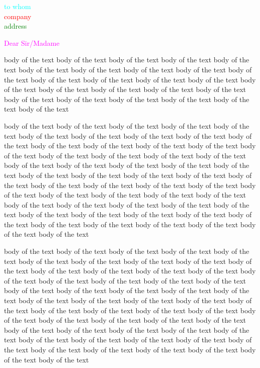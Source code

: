 \documentclass[11pt,letterpaper,foldmarks=on]{letter}
\date{\textcolor{green}{date}}
\begin{document}
\begin{letter}{
	\textcolor{cyan}{to whom} \\ \medskip \textcolor{red}{company} \\ \textcolor{green}{address}
}

\opening{
	\vspace{\baselineskip}
	\textcolor{magenta}{Dear Sir/Madame}
	\vspace{\baselineskip}
}




{
\color{yellow}
body of the text body of the text body of the text body of the text body of the text body of the text body of the text body of the text body of the text body of the text body of the text body of the text body of the text body of the text body of the text body of the text body of the text body of the text body of the text body of the text body of the text body of the text body of the text body of the text body of the text

\quad body of the text body of the text body of the text body of the text body of the text body of the text body of the text body of the text body of the text body of the text body of the text body of the text body of the text body of the text body of the text body of the text body of the text body of the text body of the text body of the text body of the text body of the text body of the text body of the text body of the text body of the text body of the text body of the text body of the text body of the text body of the text body of the text body of the text body of the text body of the text body of the text body of the text body of the text body of the text body of the text body of the text body of the text body of the text body of the text body of the text body of the text body of the text body of the text body of the text body of the text body of the text body of the text body of the text body of the text

\quad body of the text body of the text body of the text body of the text body of the text body of the text body of the text body of the text body of the text body of the text body of the text body of the text body of the text body of the text body of the text body of the text body of the text body of the text body of the text body of the text body of the text body of the text body of the text body of the text body of the text body of the text body of the text body of the text body of the text body of the text body of the text body of the text body of the text body of the text body of the text body of the text body of the text body of the text body of the text body of the text body of the text body of the text body of the text body of the text body of the text body of the text body of the text body of the text body of the text body of the text body of the text body of the text body of the text body of the text

}
\end{letter}
\end{document}
